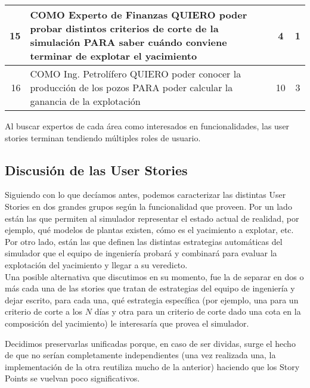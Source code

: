 \begin{center}
\begin{tabular}{| r | p{13cm} | c | c | }
    15 & COMO Experto de Finanzas QUIERO poder probar distintos criterios de corte de la simulación PARA saber cuándo conviene terminar de explotar el yacimiento & 4 & 1\\ \hline

    16 & COMO Ing. Petrolífero QUIERO poder conocer la producción de los pozos PARA poder calcular la ganancia de la explotación & 10 & 3\\ \hline
    
  \end{tabular}
\end{center}

Al buscar expertos de cada área como interesados en funcionalidades, las user stories terminan tendiendo múltiples roles de usuario.

\subsection{Discusión de las User Stories}

Siguiendo con lo que decíamos antes, podemos caracterizar las 
distintas User Stories en dos grandes grupos según la funcionalidad que proveen.  
Por un lado están las que permiten al simulador representar el estado actual de realidad, 
por ejemplo, qué modelos de plantas existen, cómo es el yacimiento a explotar, etc.
Por otro lado, están las que definen las distintas estrategias automáticas del 
simulador que el equipo de ingeniería probará y combinará para evaluar la explotación 
del yacimiento y llegar a su veredicto. \\

Una posible alternativa que discutimos en su momento, fue la de separar en dos o más cada una de las stories que tratan de estrategias del equipo de ingeniería y dejar escrito, para cada una, qué estrategia específica (por ejemplo, una para un criterio de corte a los $N$ días y otra para un criterio de corte dado una cota en la composición del yacimiento) le interesaría que provea el simulador.

Decidimos preservarlas unificadas porque, en caso de ser dividas, surge el hecho de que no serían completamente independientes (una vez realizada una, la implementación de la otra reutiliza mucho de la anterior) haciendo que los Story Points se vuelvan poco significativos.
\\

